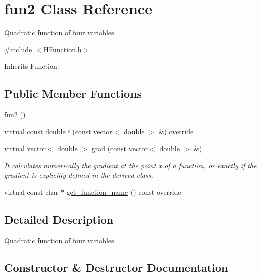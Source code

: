 \hypertarget{classfun2}{}\section{fun2 Class Reference}
\label{classfun2}


Quadratic function of four variables.  




{\ttfamily \#include $<$H\+Function.\+h$>$}



Inherits \hyperlink{class_function}{Function}.

\subsection*{Public Member Functions}
\begin{DoxyCompactItemize}
\item 
\hyperlink{classfun2_a6b8bfe183aa29e73d5abdab7d9f14cb3}{fun2} ()
\item 
virtual const double \hyperlink{classfun2_a8c363f61d3161648813004cfc341cbd1}{f} (const vector$<$ double $>$ \&) override
\item 
virtual vector$<$ double $>$ \hyperlink{classfun2_ae8465662c95bd065f993853609277e9b}{grad} (const vector$<$ double $>$ \&)
\begin{DoxyCompactList}\small\item\em It calculates numerically the gradient at the point x of a function, or exactly if the gradient is explicitly defined in the derived class. \end{DoxyCompactList}\item 
virtual const char $\ast$ \hyperlink{classfun2_ad46fa2b40e24f7c13ea765f8ff5f9c24}{get\+\_\+function\+\_\+name} () const override
\end{DoxyCompactItemize}


\subsection{Detailed Description}
Quadratic function of four variables. 

\subsection{Constructor \& Destructor Documentation}
\mbox{\label{classfun2_a6b8bfe183aa29e73d5abdab7d9f14cb3}} 
